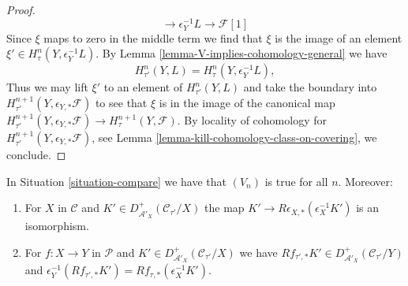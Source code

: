 \begin{proof}
$$\to \epsilon_Y^{-1}L \to \mathcal{F}[1]
$$
Since $\xi$ maps to zero in the middle term we find
that $\xi$ is the image of an element
$\xi' \in H^n_\tau(Y, \epsilon_Y^{-1}L)$.
By Lemma \ref{lemma-V-implies-cohomology-general} we have
$$
H^n_{\tau'}(Y, L) = H^n_\tau(Y, \epsilon_Y^{-1}L),
$$
Thus we may lift $\xi'$ to an element of $H^n_{\tau'}(Y, L)$
and take the boundary into
$H^{n + 1}_{\tau'}(Y, \epsilon_{Y, *}\mathcal{F})$
to see that $\xi$ is in the image of the canonical map
$H^{n + 1}_{\tau'}(Y, \epsilon_{Y, *}\mathcal{F}) \to
H^{n + 1}_\tau(Y, \mathcal{F})$.
By locality of cohomology for
$H^{n + 1}_{\tau'}(Y,\epsilon_{Y, *}\mathcal{F})$, see
Lemma \ref{lemma-kill-cohomology-class-on-covering},
we conclude.
\end{proof}

\begin{lemma}
\label{lemma-V-C-all-n-general}
In Situation \ref{situation-compare} we have that
$(V_n)$ is true for all $n$. Moreover:
\begin{enumerate}
\item For $X$ in $\mathcal{C}$ and
$K' \in D^+_{\mathcal{A}'_X}(\mathcal{C}_{\tau'}/X)$ the map
$K' \to R\epsilon_{X, *}(\epsilon_X^{-1}K')$ is an isomorphism.
\item For $f : X \to Y$ in $\mathcal{P}$ and
$K' \in D^+_{\mathcal{A}'_X}(\mathcal{C}_{\tau'}/X)$ we have
$Rf_{\tau', *}K' \in D^+_{\mathcal{A}'_X}(\mathcal{C}_{\tau'}/Y)$ and
$\epsilon_Y^{-1}(Rf_{\tau', *}K') = Rf_{\tau, *}(\epsilon_X^{-1}K')$.
\end{enumerate}
\end{lemma}

